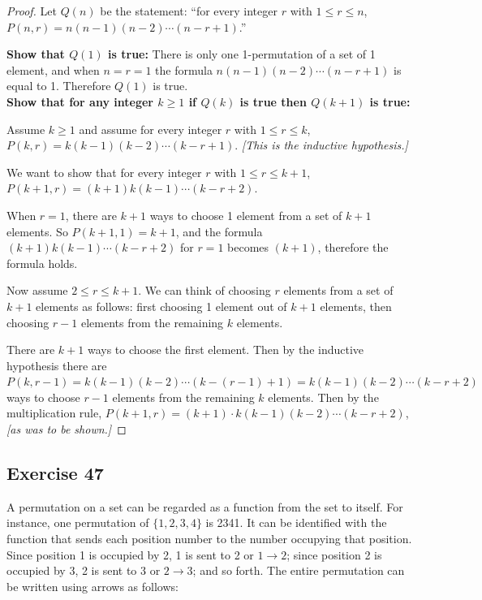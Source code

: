 \documentclass[14pt]{extarticle}
\begin{document}
\begin{proof}
Let \(Q(n)\) be the statement: ``for every integer $r$ with \(1 \leq r \leq n\), 
\(P(n,r) = n(n - 1)(n - 2) \cdots (n - r + 1)\).''

{\bf Show that \(Q(1)\) is true:} There is only one 1-permutation of a set of 1 element, and when \(n=r=1\)
the formula \(n(n - 1)(n - 2) \cdots (n - r + 1)\) is equal to 1. Therefore \(Q(1)\) is true. \\
{\bf Show that for any integer \(k \geq 1\) if \(Q(k)\) is true then \(Q(k+1)\) is true:} 

Assume \(k \geq 1\) and assume for every integer $r$ with \(1 \leq r \leq k\), \(P(k,r) = k(k - 1)(k - 2) \cdots (k-r+1)\). 
{\it [This is the inductive hypothesis.]}

We want to show that for every integer $r$ with \(1 \leq r \leq k+1\), \(P(k+1,r) = (k+1)k(k-1) \cdots (k-r + 2)\).

When \(r = 1\), there are $k+1$ ways to choose 1 element from a set of $k+1$ elements. So \(P(k+1,1) = k+1\), and
the formula \((k+1)k(k-1) \cdots (k-r + 2)\) for \(r = 1\) becomes \((k+1)\), therefore the formula holds.

Now assume \(2 \leq r \leq k+1\). We can think of choosing $r$ elements from a set of $k+1$ elements as follows: first
choosing 1 element out of $k+1$ elements, then choosing $r-1$ elements from the remaining $k$ elements.

There are $k+1$ ways to choose the first element. Then by the inductive hypothesis there are \(P(k, r-1) = k(k - 1)
(k - 2) \cdots (k - (r-1) + 1) = k(k - 1)(k - 2) \cdots (k - r + 2)\) ways to choose $r-1$ elements from the remaining
$k$ elements. Then by the multiplication rule, \(P(k+1,r) = (k+1) \cdot k(k - 1)(k - 2) \cdots (k - r + 2)\), 
{\it [as was to be shown.]}
\end{proof}

\subsection{Exercise 47}
A permutation on a set can be regarded as a function from the set to itself. For instance, one permutation of 
\(\{1, 2, 3, 4\}\) is 2341. It can be identified with the function that sends each position number to the number 
occupying that position. Since position 1 is occupied by 2, 1 is sent to 2 or \(1 \to 2\); since position 2 is occupied 
by 3, 2 is sent to 3 or \(2 \to 3\); and so forth. The entire permutation can be written using arrows as follows:
\end{document}
